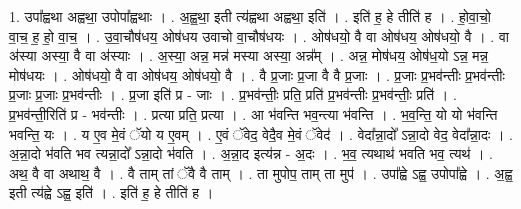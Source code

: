 \documentclass[17pt]{extarticle}
\begin{document}
1. उपा᳚ह्वथा अह्वथा॒ उपोपा᳚ह्वथाः । . अ॒ह्व॒था॒ इती त्य॑ह्वथा अह्वथा॒ इति॑ । . इति॑ ह॒ हे तीति॑ ह । . हो॒वा॒चो॒ वा॒च॒ ह॒ हो॒ वा॒च॒ । . उ॒वा॒चौष॑धय॒ ओष॑धय उवाचो वा॒चौष॑धयः । . ओष॑धयो॒ वै वा ओष॑धय॒ ओष॑धयो॒ वै । . वा अ॑स्या अस्या॒ वै वा अ॑स्याः । . अ॒स्या॒ अन्न॒ मन्न॑ मस्या अस्या॒ अन्न᳚म् । . अन्न॒ मोष॑धय॒ ओष॑ध॒यो ऽन्न॒ मन्न॒ मोष॑धयः । . ओष॑धयो॒ वै वा ओष॑धय॒ ओष॑धयो॒ वै । . वै प्र॒जाः प्र॒जा वै वै प्र॒जाः । . प्र॒जाः प्र॒भव॑न्तीः प्र॒भव॑न्तीः प्र॒जाः प्र॒जाः प्र॒भव॑न्तीः । . प्र॒जा इति॑ प्र - जाः । . प्र॒भव॑न्तीः॒ प्रति॒ प्रति॑ प्र॒भव॑न्तीः प्र॒भव॑न्तीः॒ प्रति॑ । . प्र॒भव॑न्ती॒रिति॑ प्र - भव॑न्तीः । . प्रत्या प्रति॒ प्रत्या । . आ भ॑वन्ति भव॒न्त्या भ॑वन्ति । . भ॒व॒न्ति॒ यो यो भ॑वन्ति भवन्ति॒ यः । . य ए॒व मे॒वं ॅयो य ए॒वम् । . ए॒वं ॅवेद॒ वेदै॒व मे॒वं ॅवेद॑ । . वेदा᳚न्ना॒दो᳚ ऽन्ना॒दो वेद॒ वेदा᳚न्ना॒दः । . अ॒न्ना॒दो भ॑वति भव त्यन्ना॒दो᳚ ऽन्ना॒दो भ॑वति । . अ॒न्ना॒द इत्य॑न्न - अ॒दः । . भ॒व॒ त्यथाथ॑ भवति भव॒ त्यथ॑ । . अथ॒ वै वा अथाथ॒ वै । . वै ताम् तां ॅवै वै ताम् । . ता मुपोप॒ ताम् ता मुप॑ । . उपा᳚ह्वे ऽह्व॒ उपोपा᳚ह्वे । . अ॒ह्व॒ इती त्य॑ह्वे ऽह्व॒ इति॑ । . इति॑ ह॒ हे तीति॑ ह । \newline
\end{document}
